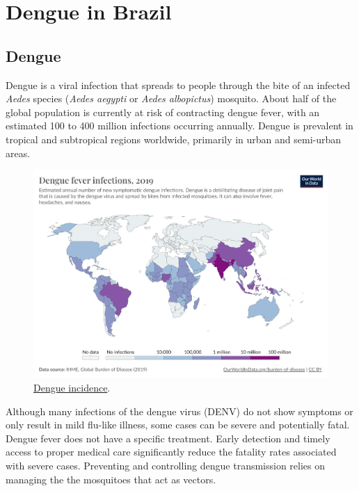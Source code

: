 \documentclass[
  letterpaper,
  DIV=11,
  numbers=noendperiod]{scrreprt}
\begin{document}
\part{Dengue in Brazil}

\hypertarget{dengue}{%
\chapter{Dengue}\label{dengue}}

Dengue is a viral infection that spreads to people through the bite of
an infected \emph{Aedes} species (\emph{Aedes aegypti} or \emph{Aedes
albopictus}) mosquito. About half of the global population is currently
at risk of contracting dengue fever, with an estimated 100 to 400
million infections occurring annually. Dengue is prevalent in tropical
and subtropical regions worldwide, primarily in urban and semi-urban
areas.

\begin{figure}

{\centering \includegraphics[width=11.33in,height=\textheight]{img/dengueincidence.png}

}

\caption{\label{fig-dengueincidence}\href{https://ourworldindata.org/grapher/dengue-incidence}{Dengue
incidence}.}

\end{figure}

Although many infections of the dengue virus (DENV) do not show symptoms
or only result in mild flu-like illness, some cases can be severe and
potentially fatal. Dengue fever does not have a specific treatment.
Early detection and timely access to proper medical care significantly
reduce the fatality rates associated with severe cases. Preventing and
controlling dengue transmission relies on managing the the mosquitoes
that act as vectors.
\end{document}
